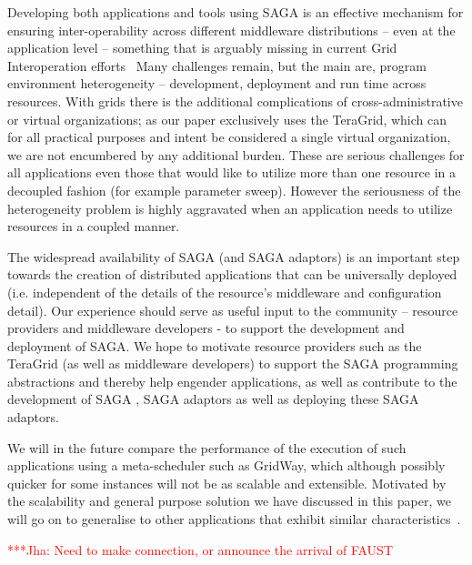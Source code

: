 \documentclass[conference,final]{IEEEtran}
\newcommand{\jhanote}[1]{ {\textcolor{red} { ***Jha: #1 }}}
\begin{document}
Developing both applications and tools using SAGA is an effective
mechanism for ensuring inter-operability across different middleware
distributions -- even at the application level -- something that is
arguably missing in current Grid Interoperation
efforts~\cite{gin_paper} Many challenges remain, but the main are,
program environment heterogeneity -- development, deployment and run
time across resources.  With grids there is the additional
complications of cross-administrative or virtual organizations; as our
paper exclusively uses the TeraGrid, which can for all practical
purposes and intent be considered a single virtual organization, we
are not encumbered by any additional burden. These are serious
challenges for all applications even those that would like to utilize
more than one resource in a decoupled fashion (for example parameter
sweep).  However the seriousness of the heterogeneity problem is
highly aggravated when an application needs to utilize resources in a
coupled manner.

The widespread availability of SAGA (and SAGA adaptors) is an
important step towards the creation of distributed applications that
can be universally deployed (i.e.  independent of the details of the
resource's middleware and configuration detail).  Our experience
should serve as useful input to the community -- resource providers
and middleware developers - to support the development and deployment
of SAGA.  We hope to motivate  resource providers such as the TeraGrid
(as well as middleware developers) to support the SAGA programming
abstractions and thereby help engender applications, as well as
contribute to the development of SAGA , SAGA adaptors as well as
deploying these SAGA adaptors.

We will in the future compare the performance of the execution of such
applications using a meta-scheduler such as GridWay, which although
possibly quicker for some instances will not be as scalable and
extensible. Motivated by the scalability and general purpose solution
we have discussed in this paper, we will go on to generalise to other
applications that exhibit similar characteristics~\cite{nature99}.

\jhanote{Need to make connection, or announce the arrival of FAUST}



\end{document}
